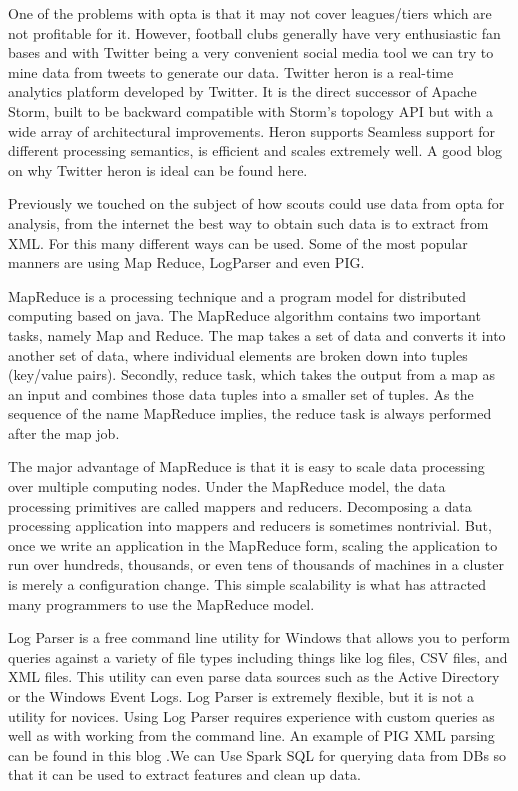 \documentclass[sigconf]{acmart}
\begin{document}
One of the problems with opta is that it may not cover leagues/tiers which are not profitable for it. However, football clubs generally have very enthusiastic fan bases and with Twitter being a very convenient social media tool we can try to mine data from tweets to generate our data. Twitter heron is a real-time analytics platform developed by Twitter. It is the direct successor of Apache Storm, built to be backward compatible with Storm's topology API but with a wide array of architectural improvements. Heron supports Seamless support for different processing semantics, is efficient and scales extremely well. A good blog on why Twitter heron is ideal can be found here.\cite{Ramasamy2000}

Previously we touched on the subject of how scouts could use data from opta for analysis, from the internet the best way to obtain such data is to extract from XML. For this many different ways can be used. Some of the most popular manners are using Map Reduce, LogParser and even PIG.

MapReduce is a processing technique and a program model for distributed computing based on java. The MapReduce algorithm contains two important tasks, namely Map and Reduce. The map takes a set of data and converts it into another set of data, where individual elements are broken down into tuples (key/value pairs). Secondly, reduce task, which takes the output from a map as an input and combines those data tuples into a smaller set of tuples. As the sequence of the name MapReduce implies, the reduce task is always performed after the map job.

The major advantage of MapReduce is that it is easy to scale data processing over multiple computing nodes. Under the MapReduce model, the data processing primitives are called mappers and reducers. Decomposing a data processing application into mappers and reducers is sometimes nontrivial. But, once we write an application in the MapReduce form, scaling the application to run over hundreds, thousands, or even tens of thousands of machines in a cluster is merely a configuration change. This simple scalability is what has attracted many programmers to use the MapReduce model.\cite{Tutorialspoint2000}

Log Parser is a free command line utility for Windows that allows you to perform queries against a variety of file types including things like log files, CSV files, and XML files. This utility can even parse data sources such as the Active Directory or the Windows Event Logs.
Log Parser is extremely flexible, but it is not a utility for novices. Using Log Parser requires experience with custom queries as well as with working from the command line.
An example of PIG XML parsing can be found in this blog \cite{learnbigdataanalytics2000}.We can Use Spark SQL for querying data from DBs so that it can be used to extract features and clean up data. 
\end{document}
